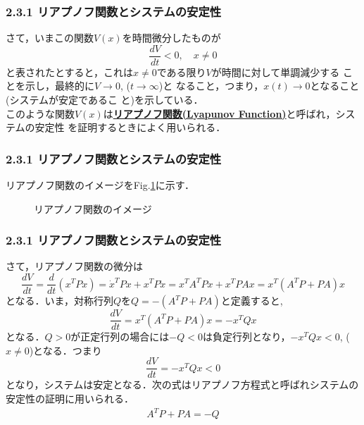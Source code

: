 \begin{frame}[t]
\frametitle{2.3.1 リアプノフ関数とシステムの安定性}
さて，いまこの関数$V(x)$を時間微分したものが
\begin{equation}
 \frac{d V}{d t} < 0, \quad x \neq 0
  \label{lyapunov_1D}
\end{equation}
と表されたとすると，これは$x \neq 0$である限り$V$が時間に対して単調減少する
ことを示し，最終的に$ V \rightarrow 0$, ($t \rightarrow \infty$)と
なること，つまり，$x(t) \rightarrow 0$となること(システムが安定であるこ
と)を示している．
\\[3mm]

このような関数$V(x)$は{\bf \underline{リアプノフ関数(Lyapunov Function)}}と呼ばれ，システムの安定性
を証明するときによく用いられる．
\end{frame}

\begin{frame}[t]
\frametitle{2.3.1 リアプノフ関数とシステムの安定性}

リアプノフ関数のイメージをFig.\ref{fig:lyapunovD}に示す．

\begin{figure}[htbp]
 \begin{center}
  \caption{リアプノフ関数のイメージ}
  \label{fig:lyapunovD}
 \end{center}
\end{figure}

\end{frame}

\begin{frame}[t]
\frametitle{2.3.1 リアプノフ関数とシステムの安定性}
さて，リアプノフ関数の微分は
\begin{equation}
 \frac{d V}{d t} = \frac{d}{dt} (x^T P x) = \dot{x}^T P x + x^T P \dot{x} = x^T A^T P x + x^T P A x = x^T (A^T P + P A) x
\label{Lyapunov_d}
\end{equation}
となる．いま，対称行列$Q$を$Q=-(A^T P + P A)$と定義すると,
\begin{equation}
 \frac{d V}{d t} = x^T (A^T P + P A) x = -x^T Q x
\label{lyapunov_Q}
\end{equation}
となる．$Q>0$が正定行列の場合には$-Q<0$は負定行列となり，$- x^T Q x < 0 $, ($x \neq 0$)となる．つまり
\begin{equation}
 \frac{d V}{d t} = - x^T Q x<0
\label{Lyapunov_d2}
\end{equation}
となり，システムは安定となる．次の式はリアプノフ方程式と呼ばれシステムの安定性の証明に用いられる．
\begin{eqnarray}
	A^T P + P A = - Q
\label{Lyapunov_eq}
\end{eqnarray}

\end{frame}

